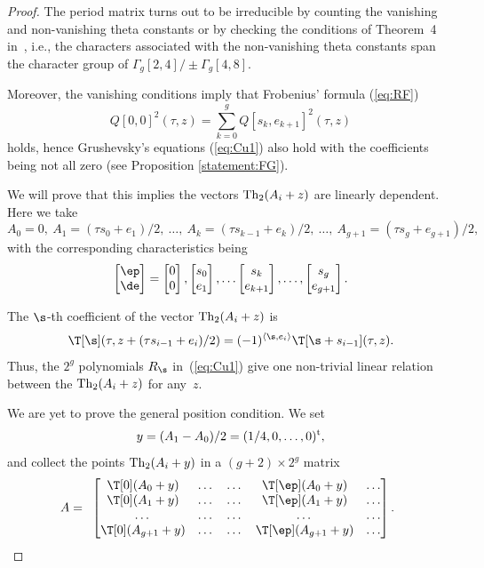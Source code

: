 \begin{proof}The period matrix turns out to be irreducible by counting the vanishing and non-vanishing theta constants or by checking the conditions of Theorem~4 in~\cite{SM}, i.e., the characters associated with the non-vanishing theta constants span the character group of
 $\Gamma_g[2,4]/\pm \Gamma_g[4,8]$.

Moreover, the vanishing conditions imply that Frobenius' formula (\ref{eq:RF})
\[
 Q[0, 0]^2 (\tau, z)=\sum_{k=0}^g Q[s_k, e_{k+1}]^2(\tau, z)
\]
 holds, hence Grushevsky's equations
 (\ref{eq:Cu1}) also hold with the coefficients being not all zero (see Proposition \ref{statement:FG}).

 We will prove that this implies the vectors ${\rm Th}_2(A_i + z) $ are linearly dependent.
 Here we take
 \[
A_0=0, \ A_1=(\tau s_0 + e_1)/2, \ \dots, \ A_k= (\tau s_{k-1} + e_k)/2, \ \dots, \ A_{g+1}= (\tau s_{g} + e_{g+1})/2,
\]
 with the corresponding characteristics being
\[
\begin{bmatrix} \ep \\ \de\end{bmatrix} =\begin{bmatrix} 0 \\ 0 \end{bmatrix} ,\begin{bmatrix} s_0 \\ e_{1}\end{bmatrix}, \dots\begin{bmatrix} s_k \\ e_{k+1} \end{bmatrix},\dots,\begin{bmatrix} s_g \\ e_{g+1} \end{bmatrix}.
\]

The $\s$-th coefficient of the vector ${\rm Th}_2(A_i + z)$ is
\[
\T[\s](\tau, z+(\tau s_{i-1} + e_i)/2)= (-1)^{\langle \s, e_i\rangle}\T[\s+s_{i-1}](\tau, z).
\]
Thus, the $2^g$ polynomials $R_\s$ in~(\ref{eq:Cu1}) give one non-trivial linear relation between the ${\rm Th}_2(A_i + z)$ for any~$z$.

We are yet to prove the general position condition. We set
\[
y=(A_1-A_0)/2= (1/4,0,\dots , 0)^{\rm t},
\]
and collect the points ${\rm Th}_2(A_i+y)$ in a $(g+2)\times 2^g$ matrix
\[
A=
 \begin{array}{ccccc}
 \begin{bmatrix} \T[0](A_0+y)&\dots&\dots& \T[\ep] (A_0+y)&\dots\\
\T[0](A_1+y)&\dots&\dots& \T[\ep] (A_1+y)&\dots\\
\dots&\dots&\dots&\dots&\dots\\
\T[0](A_{g+1}+y)&\dots&\dots& \T[\ep] (A_{g+1}+y)&\dots
 \end{bmatrix}.
 \end{array}
\]


\end{proof}
